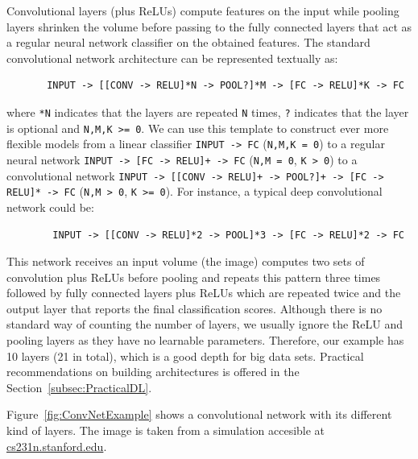 \bigskip
Convolutional layers (plus ReLUs) compute features on the input while pooling layers shrinken the volume before passing to the fully connected layers that act as a regular neural network classifier on the obtained features. The standard convolutional network architecture can be represented textually as:
\begin{verbatim}
       INPUT -> [[CONV -> RELU]*N -> POOL?]*M -> [FC -> RELU]*K -> FC
\end{verbatim}
where \texttt{*N} indicates that the layers are repeated \texttt{N} times, \texttt{?} indicates that the layer is optional and \texttt{N,M,K >= 0}. We can use this template to construct ever more flexible models from a linear classifier \texttt{INPUT -> FC} (\texttt{N,M,K = 0}) to a regular neural network \texttt{INPUT -> [FC -> RELU]+ -> FC} (\texttt{N,M = 0}, \texttt{K > 0}) to a convolutional network \texttt{INPUT -> [[CONV -> RELU]+ -> POOL?]+ -> [FC -> RELU]* -> FC} (\texttt{N,M > 0}, \texttt{K >= 0}). For instance, a typical deep convolutional network could be:
\begin{verbatim}
        INPUT -> [[CONV -> RELU]*2 -> POOL]*3 -> [FC -> RELU]*2 -> FC
\end{verbatim}
This network receives an input volume (the image) computes two sets of convolution plus ReLUs before pooling and repeats this pattern three times followed by fully connected layers plus ReLUs which are repeated twice and the output layer that reports the final classification scores. Although there is no standard way of counting the number of layers, we usually ignore the ReLU and pooling layers as they have no learnable parameters. Therefore, our example has 10 layers (21 in total), which is a good depth for big data sets. Practical recommendations on building architectures is offered in the Section~\ref{subsec:PracticalDL}.

Figure~\ref{fig:ConvNetExample} shows a convolutional network with its different kind of layers. The image is taken from a simulation accesible at \url{cs231n.stanford.edu}.

